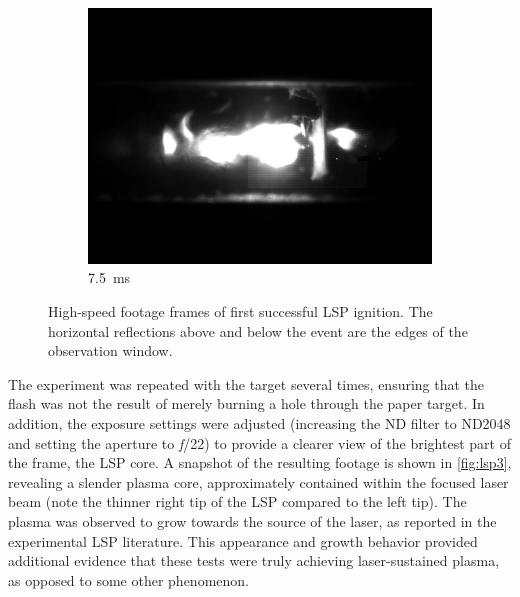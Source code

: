 \begin{figure}[h]
\begin{subfigure}[t]{0.32\textwidth}
                \end{subfigure}
                \hfill
                \begin{subfigure}[t]{0.32\textwidth}
                    \centering
                    \includegraphics[width=\textwidth]{assets/3 design/LSP1_frames/75.jpg}
                    \caption{7.5~ms}
                    \label{fig:lsp1_75}
                \end{subfigure}
                \caption[High-speed footage frames of first successful LSP ignition]{High-speed footage frames of first successful LSP ignition. The horizontal reflections above and below the event are the edges of the observation window.}
                \label{fig:lsp1}
            \end{figure}

            The experiment was repeated with the target several times, ensuring that the flash was not the result of merely burning a hole through the paper target. In addition, the exposure settings were adjusted (increasing the ND filter to ND2048 and setting the aperture to \textit{f}/22) to provide a clearer view of the brightest part of the frame, the LSP core. A snapshot of the resulting footage is shown in \autoref{fig:lsp3}, revealing a slender plasma core, approximately contained within the focused laser beam (note the thinner right tip of the LSP compared to the left tip). The plasma was observed to grow towards the source of the laser, as reported in the experimental LSP literature. This appearance and growth behavior provided additional evidence that these tests were truly achieving laser-sustained plasma, as opposed to some other phenomenon.

